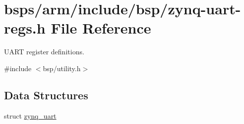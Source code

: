 \hypertarget{zynq-uart-regs_8h}{}\section{bsps/arm/include/bsp/zynq-\/uart-\/regs.h File Reference}
\label{zynq-uart-regs_8h}


U\+A\+RT register definitions.  


{\ttfamily \#include $<$bsp/utility.\+h$>$}\newline
\subsection*{Data Structures}
\begin{DoxyCompactItemize}
\item 
struct \mbox{\hyperlink{structzynq__uart}{zynq\+\_\+uart}}
\end{DoxyCompactItemize}
